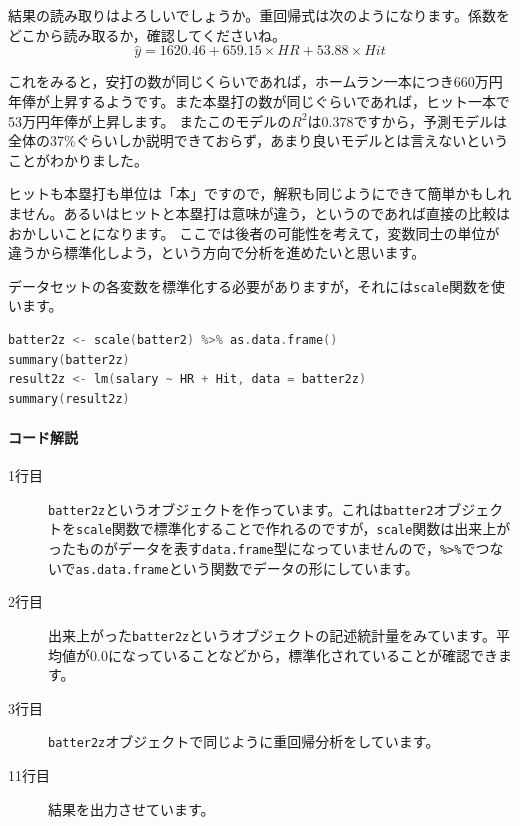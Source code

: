 \documentclass{ltjbook}
\begin{document}
結果の読み取りはよろしいでしょうか。重回帰式は次のようになります。係数をどこから読み取るか，確認してくださいね。
\[ \hat{y} = 1620.46 + 659.15 \times HR + 53.88 \times Hit \]

これをみると，安打の数が同じくらいであれば，ホームラン一本につき660万円年俸が上昇するようです。また本塁打の数が同じぐらいであれば，ヒット一本で53万円年俸が上昇します。
またこのモデルの$R^2$は$0.378$ですから，予測モデルは全体の37\%ぐらいしか説明できておらず，あまり良いモデルとは言えないということがわかりました。

ヒットも本塁打も単位は「本」ですので，解釈も同じようにできて簡単かもしれません。あるいはヒットと本塁打は意味が違う，というのであれば直接の比較はおかしいことになります。
ここでは後者の可能性を考えて，変数同士の単位が違うから標準化しよう，という方向で分析を進めたいと思います。

データセットの各変数を標準化する必要がありますが，それには\texttt{scale}関数を使います。

\begin{lstlisting}[language=c++,label={code:11_08},caption={標準化したデータで重回帰分析を実行}]
batter2z <- scale(batter2) %>% as.data.frame()
summary(batter2z)
result2z <- lm(salary ~ HR + Hit, data = batter2z)
summary(result2z)
\end{lstlisting}


\paragraph{コード解説}
\begin{description}
	\item[1行目]\texttt{batter2z}というオブジェクトを作っています。これは\texttt{batter2}オブジェクトを\verb|scale|関数で標準化することで作れるのですが，\verb|scale|関数は出来上がったものがデータを表す\texttt{data.frame}型になっていませんので，\verb|%>%|でつないで\verb|as.data.frame|という関数でデータの形にしています。
	\item[2行目] 出来上がった\texttt{batter2z}というオブジェクトの記述統計量をみています。平均値が0.0になっていることなどから，標準化されていることが確認できます。
	\item[3行目]  \texttt{batter2z}オブジェクトで同じように重回帰分析をしています。
	\item[11行目] 結果を出力させています。
\end{description}
\end{document}
